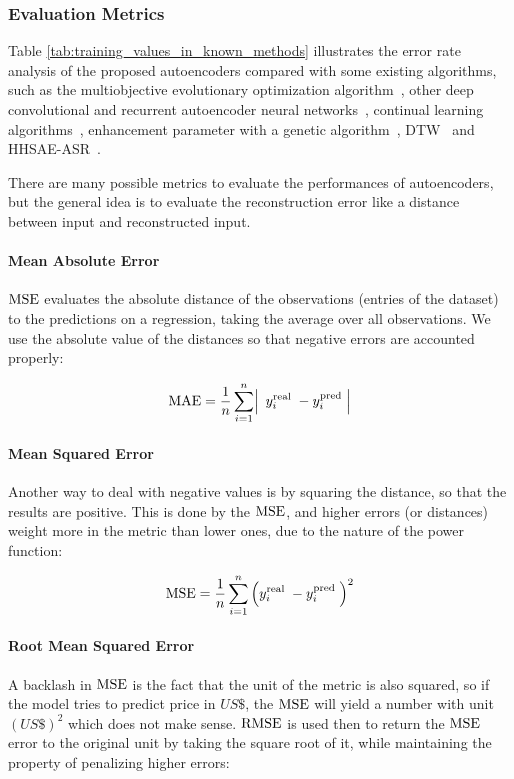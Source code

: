 \subsubsection{Evaluation Metrics}
Table \vref{tab:training_values_in_known_methods} illustrates the error rate analysis of the proposed autoencoders compared with some existing algorithms, such as the multiobjective evolutionary optimization algorithm~\cite{c4}, other deep convolutional and recurrent autoencoder neural networks~\cite{c5}, continual learning algorithms~\cite{c6}, enhancement parameter with a genetic algorithm~\cite{c7}, DTW~\cite{c8} and HHSAE-ASR~\cite{c9}. 

There are many possible metrics to evaluate the performances of autoencoders, but the general idea is to evaluate the reconstruction error like a distance between input and reconstructed input.

\paragraph{Mean Absolute Error}
$\operatorname{MSE}$ evaluates the absolute distance of the observations (entries of the dataset) to the predictions on a regression, taking the average over all observations. We use the absolute value of the distances so that negative errors are accounted properly:

$$
\mae = \frac{1}{n} \sum_{i=1}^{n} \abs*{ \, \,\, y_{i}^{\text {real }}-y_{i}^{\text {pred }}}
$$

\paragraph{Mean Squared Error}
Another way to deal with negative values is by squaring the distance, so that the results are positive. This is done by the $\operatorname{MSE}$, and higher errors (or distances) weight more in the metric than lower ones, due to the nature of the power function:

$$
\operatorname{MSE}=\frac{1}{n} \sum_{i=1}^{n}\left(y_{i}^{\text {real }}-y_{i}^{\text {pred }}\right)^{2}
$$

\paragraph{Root Mean Squared Error}
A backlash in $\operatorname{MSE}$ is the fact that the unit of the metric is also squared, so if the model tries to predict price in $US\$$, the $\operatorname{MSE}$ will yield a number with unit $(US\$)^2$ which does not make sense. $\operatorname{RMSE}$ is used then to return the $\operatorname{MSE}$ error to the original unit by taking the square root of it, while maintaining the property of penalizing higher errors:

